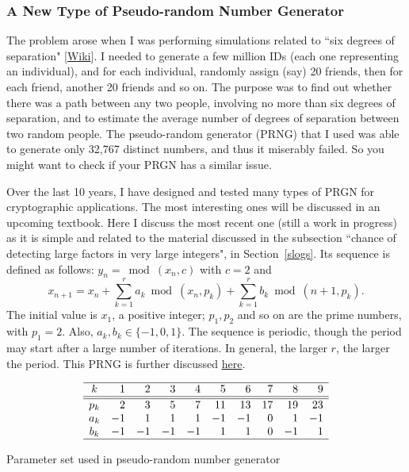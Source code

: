 \documentclass[10pt]{article}
\begin{document}
\subsubsection{A New Type of Pseudo-random Number Generator}\label{prng0988}

The problem arose when I was performing simulations related to ``six degrees of separation" [\href{https://en.wikipedia.org/wiki/Six_degrees_of_separation}{Wiki}]. 
I needed to generate a few million IDs (each one representing an individual), and for each individual, randomly assign (say) 20 friends, then for each friend, another 20 friends and so on. 
The purpose was to find out whether there was a path between any two people, involving no more than six degrees of separation, and to estimate the average number of degrees of separation between two random people. The pseudo-random generator (PRNG) that I used was able to generate only 32,767 distinct numbers, and thus it miserably failed. So you might want to check if your PRGN has a similar issue.

Over the last 10 years, I have designed and tested many types of PRGN for cryptographic applications. The most interesting ones will be discussed in an upcoming textbook. Here I discuss the most recent one (still a work in progress) as it is simple and related to the material discussed in the subsection ``chance of detecting large factors in very large integers", in Section~\ref{slogs}. Its sequence is defined as follows: $y_n=\bmod(x_n,c)$ with $c=2$ and
$$x_{n+1} = x_n +\sum_{k=1}^r a_k\bmod(x_n,p_k)+\sum_{k=1}^r b_k\bmod(n+1,p_k).$$
The initial value is $x_1$, a positive integer; $p_1,p_2$ and so on are the prime numbers, with $p_1=2$. Also, $a_k,b_k\in \{-1, 0, 1\}$. The sequence is periodic, though the period may start after a large number of iterations. In general, the larger $r$, the larger the period. This PRNG is further discussed \href{https://math.stackexchange.com/questions/4308185/period-or-lack-of-for-a-probably-new-pseudo-random-number-generator}{here}.

\begin{table}%
\[
\begin{array}{crrrrrrrrr}
\hline
k & 1& 2 & 3 & 4 & 5 & 6 & 7 & 8 & 9\\ \hline
\hline
p_k & 2& 3 & 5 & 7 & 11 & 13 & 17 & 19 & 23\\ 
a_k& -1 & 1 & 1 & 1 & -1 & -1 & 0 & 1 & -1 \\ 
b_k&  -1 & -1 & -1 & -1& 1&  1 & 0 & -1 & 1\\ 
\hline
\end{array}
\]
\caption{\label{tabprng}Parameter set used in pseudo-random number generator}
\end{table}
\end{document}
